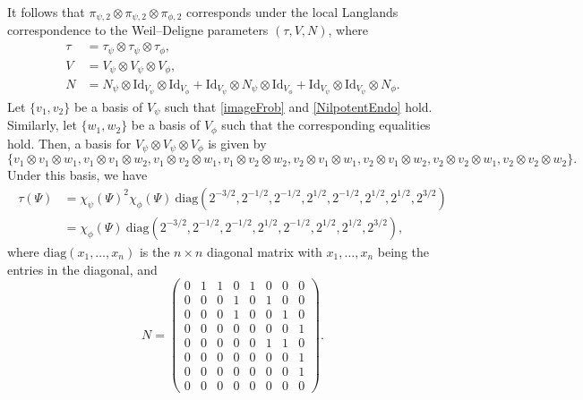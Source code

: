 \documentclass[11pt]{amsart}
\theoremstyle{definition}
\begin{document}
It follows that $\pi_{\psi,2} \otimes \pi_{\psi,2} \otimes \pi_{\phi,2}$ corresponds under the local Langlands correspondence to the Weil--Deligne parameters $(\tau, V, N)$, where 
\begin{align*}
    \tau &= \tau_{\psi} \otimes \tau_{\psi} \otimes \tau_{\phi}, \\
    V &= V_{\psi} \otimes V_{\psi} \otimes V_{\phi}, \\
    N &= N_{\psi} \otimes \mathrm{Id}_{V_{\psi}} \otimes \mathrm{Id}_{V_{\phi}} + \mathrm{Id}_{V_{\psi}} \otimes N_{\psi} \otimes \mathrm{Id}_{V_{\phi}} + \mathrm{Id}_{V_{\psi}} \otimes \mathrm{Id}_{V_{\psi}} \otimes N_{\phi}.
\end{align*}
Let $\{v_1, v_2\}$ be a basis of $V_{\psi}$ such that \eqref{imageFrob} and \eqref{NilpotentEndo} hold. Similarly, let $\{w_1, w_2\}$ be a basis of $V_{\phi}$ such that the corresponding equalities hold. Then, a basis for $V_{\psi} \otimes V_{\psi} \otimes V_{\phi}$ is given by $$ \{v_1 \otimes v_1 \otimes w_1, v_1 \otimes v_1 \otimes w_2, v_1 \otimes v_2 \otimes w_1, v_1 \otimes v_2 \otimes w_2, v_2 \otimes v_1 \otimes w_1, v_2 \otimes v_1 \otimes w_2, v_2 \otimes v_2 \otimes w_1, v_2 \otimes v_2 \otimes w_2\}. $$ Under this basis, we have
\begin{align}
    \tau(\Psi) &= \chi_{\psi}(\Psi)^2 \chi_{\phi}(\Psi) \: \mathrm{diag}\left(2^{-3/2}, 2^{-1/2}, 2^{-1/2}, 2^{1/2}, 2^{-1/2}, 2^{1/2}, 2^{1/2}, 2^{3/2}\right) \label{imageFrobTensorProd} \\
    &= \chi_{\phi}(\Psi) \: \mathrm{diag}\left(2^{-3/2}, 2^{-1/2}, 2^{-1/2}, 2^{1/2}, 2^{-1/2}, 2^{1/2}, 2^{1/2}, 2^{3/2}\right), \nonumber
\end{align}
where $\mathrm{diag}(x_1, \dots, x_n)$ is the $n\times n$ diagonal matrix with $x_1, \dots, x_n$ being the entries in the diagonal, and 
\begin{equation}
    N = \begin{pmatrix}
        0 & 1 & 1 & 0 & 1 & 0 & 0 & 0 \\
        0 & 0 & 0 & 1 & 0 & 1 & 0 & 0 \\
        0 & 0 & 0 & 1 & 0 & 0 & 1 & 0 \\
        0 & 0 & 0 & 0 & 0 & 0 & 0 & 1 \\
        0 & 0 & 0 & 0 & 0 & 1 & 1 & 0 \\
        0 & 0 & 0 & 0 & 0 & 0 & 0 & 1 \\
        0 & 0 & 0 & 0 & 0 & 0 & 0 & 1 \\
        0 & 0 & 0 & 0 & 0 & 0 & 0 & 0
    \end{pmatrix}. \label{NilpotentTensorProd}
\end{equation}
\end{document}
